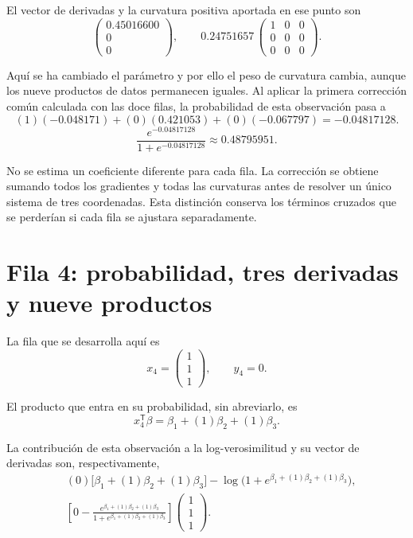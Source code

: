 \documentclass[11pt,a4paper]{article}
\newcommand{\T}{^{\mathsf T}}
\begin{document}
El vector de derivadas y la curvatura positiva aportada
en ese punto son
\[
\begin{pmatrix}0.45016600\\0\\0\end{pmatrix},\qquad 0.24751657\,\begin{pmatrix}1&0&0\\0&0&0\\0&0&0\end{pmatrix}.
\]

Aquí se ha cambiado el parámetro y por ello el peso de
curvatura cambia, aunque los nueve productos de datos
permanecen iguales.
Al aplicar la primera corrección común calculada con las doce filas,
la probabilidad de esta observación pasa a
\[
(1)(-0.048171)+(0)(0.421053)+(0)(-0.067797)=-0.04817128.
\]
\[
\frac{e^{-0.04817128}}{1+e^{-0.04817128}}\approx0.48795951.
\]

No se estima un coeficiente diferente para cada fila.
La corrección se obtiene sumando todos los gradientes y todas
las curvaturas antes de resolver un único sistema de tres coordenadas.
Esta distinción conserva los términos cruzados que se perderían
si cada fila se ajustara separadamente.

\clearpage
\section{Fila 4: probabilidad, tres derivadas y nueve productos}\label{logit86}
La fila que se desarrolla aquí es
\[
x_{4}=\begin{pmatrix}1\\1\\1\end{pmatrix},\qquad y_{4}=0.
\]

El producto que entra en su probabilidad, sin abreviarlo, es
\[
x_{4}\T\beta=\beta_1+(1)\beta_2+(1)\beta_3.
\]

La contribución de esta observación a la log-verosimilitud
y su vector de derivadas son, respectivamente,
\[
\begin{aligned}
&(0)\bigl[\beta_1+(1)\beta_2+(1)\beta_3\bigr]-\log\bigl(1+e^{\beta_1+(1)\beta_2+(1)\beta_3}\bigr),\\&\left[0-\frac{e^{\beta_1+(1)\beta_2+(1)\beta_3}}{1+e^{\beta_1+(1)\beta_2+(1)\beta_3}}\right]\begin{pmatrix}1\\1\\1\end{pmatrix}.\end{aligned}
\]
\end{document}
